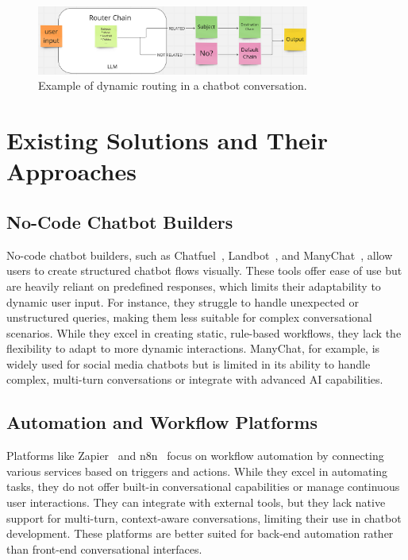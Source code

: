 \begin{figure}[ht]
    \centering
    \includegraphics[width=0.8\textwidth]{assets/LangchainRouterChainExample.png}
    \caption{Example of dynamic routing in a chatbot conversation.}
    \label{fig:router_chain_example}
\end{figure}

\section{Existing Solutions and Their Approaches}

\subsection{No-Code Chatbot Builders}
No-code chatbot builders, such as Chatfuel~\cite{chatfuel}, Landbot~\cite{landbot}, and ManyChat~\cite{manychat}, allow users to create structured chatbot flows visually. These tools offer ease of use but are heavily reliant on predefined responses, which limits their adaptability to dynamic user input. For instance, they struggle to handle unexpected or unstructured queries, making them less suitable for complex conversational scenarios. While they excel in creating static, rule-based workflows, they lack the flexibility to adapt to more dynamic interactions. ManyChat, for example, is widely used for social media chatbots but is limited in its ability to handle complex, multi-turn conversations or integrate with advanced AI capabilities.

\subsection{Automation and Workflow Platforms}
Platforms like Zapier~\cite{zapier} and n8n~\cite{n8n} focus on workflow automation by connecting various services based on triggers and actions. While they excel in automating tasks, they do not offer built-in conversational capabilities or manage continuous user interactions. They can integrate with external tools, but they lack native support for multi-turn, context-aware conversations, limiting their use in chatbot development. These platforms are better suited for back-end automation rather than front-end conversational interfaces.

